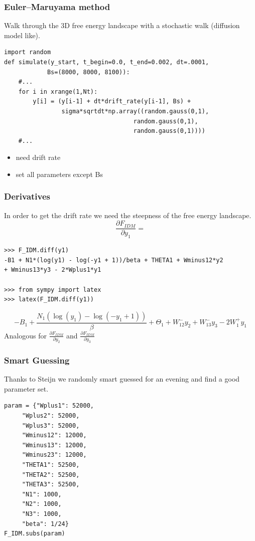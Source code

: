 \documentclass[xcolor={fixpdftex,hyperref,x11names},10pt,pdftex,hyperref={pdftex}]{beamer}
\renewcommand{\emph}[1]{\color{red}#1 \color{black}}
\begin{document}
\begin{frame}[fragile]
  \frametitle{Euler–Maruyama method}
  Walk through the 3D free energy landscape with a stochastic walk
  (diffusion model like).
  \begin{verbatim}
import random
def simulate(y_start, t_begin=0.0, t_end=0.002, dt=.0001,
            Bs=(8000, 8000, 8100)):
    #...
    for i in xrange(1,Nt):
        y[i] = (y[i-1] + dt*drift_rate(y[i-1], Bs) +
                sigma*sqrtdt*np.array((random.gauss(0,1),
                                    random.gauss(0,1),
                                    random.gauss(0,1))))
    #...
  \end{verbatim}
  \begin{itemize}
      \item need \emph{drift rate}
      \item set \emph{all parameters} except Bs
  \end{itemize}
\end{frame}

\begin{frame}[fragile]
  \frametitle{Derivatives}
In order to get the drift rate we need the steepness of the free energy
landscape.
$$\frac{\partial F_{IDM}}{\partial y_1} =$$
  \begin{verbatim}
>>> F_IDM.diff(y1)
-B1 + N1*(log(y1) - log(-y1 + 1))/beta + THETA1 + Wminus12*y2
+ Wminus13*y3 - 2*Wplus1*y1

>>> from sympy import latex
>>> latex(F_IDM.diff(y1))
  \end{verbatim}
  $$- B_{1} + \frac{N_{1} (\operatorname{log}(y_{1}) -
\operatorname{log}(- y_{1} + 1))}{\beta} + \Theta_{1} +
W^-_{12} y_{2} + W^-_{13} y_{3} - 2 W^+_{1} y_{1}$$
Analogous for $\frac{\partial F_{IDM}}{\partial y_2}$ and $\frac{\partial
F_{IDM}}{\partial y_3}$
\end{frame}

\begin{frame}[fragile]
  \frametitle{Smart Guessing}
  Thanks to Steijn we randomly smart guessed for an evening and find a good
  parameter set.
  \begin{verbatim}
param = {"Wplus1": 52000,
     "Wplus2": 52000,
     "Wplus3": 52000,
     "Wminus12": 12000,
     "Wminus13": 12000,
     "Wminus23": 12000,
     "THETA1": 52500,
     "THETA2": 52500,
     "THETA3": 52500,
     "N1": 1000,
     "N2": 1000,
     "N3": 1000,
     "beta": 1/24}
F_IDM.subs(param)
  \end{verbatim}
\end{frame}
\end{document}
